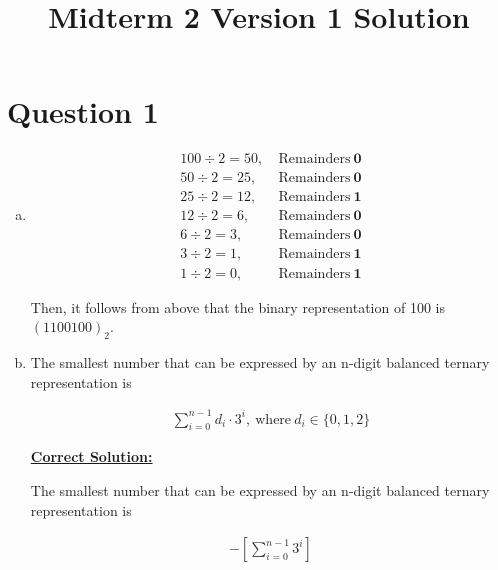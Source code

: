 \documentclass[12pt]{article}
\begin{document}
\title{Midterm 2 Version 1 Solution}
\maketitle

\section*{Question 1}
\begin{enumerate}[a.]
    \item

    \begin{align*}
        100 \div 2 = 50,\:&\text{Remainders}\:\textbf{0}\\
        50 \div 2 = 25,\:&\text{Remainders}\:\textbf{0}\\
        25 \div 2 = 12,\:&\text{Remainders}\:\textbf{1}\\
        12 \div 2 = 6,\:&\text{Remainders}\:\textbf{0}\\
        6 \div 2 = 3,\:&\text{Remainders}\:\textbf{0}\\
        3 \div 2 = 1,\:&\text{Remainders}\:\textbf{1}\\
        1 \div 2 = 0,\:&\text{Remainders}\:\textbf{1}
    \end{align*}

    \bigskip

    Then, it follows from above that the binary representation of 100 is $(1100100)_2$.

    \item The smallest number that can be expressed by an n-digit balanced ternary
    representation is

    \begin{align}
        \sum\limits_{i=0}^{n-1} d_i \cdot 3^i,\:\text{where}\:d_i \in \{0,1,2\}
    \end{align}

    \bigskip

    \begin{mdframed}
        \underline{\textbf{Correct Solution:}}

        \bigskip

        The smallest number that can be expressed by an n-digit balanced ternary
        representation is

        \setcounter{equation}{0}
        \color{red}
        \begin{align}
            -\left[ \sum\limits_{i=0}^{n-1} 3^i \right]
        \end{align}
        \color{black}
    \end{mdframed}


\end{enumerate}
\end{document}
